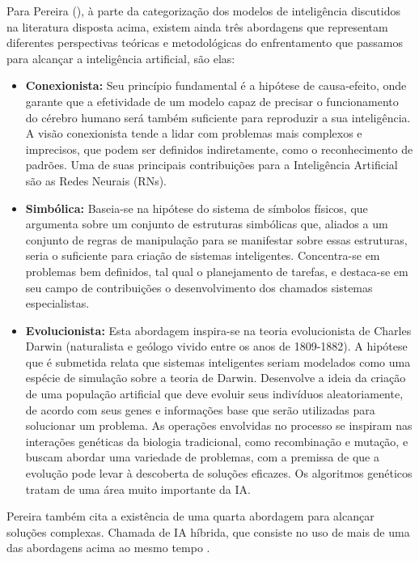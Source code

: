 \documentclass[tcc2]{uftex}
\begin{document}
Para Pereira (\citeyear{Pereira}), à parte da categorização dos modelos de inteligência discutidos na literatura disposta acima, existem ainda três abordagens que representam diferentes perspectivas teóricas e metodológicas do enfrentamento que passamos para alcançar a inteligência artificial, são elas:
\begin{itemize}
    \item \textbf{Conexionista:} Seu princípio fundamental é a hipótese de causa-efeito, onde garante que a efetividade de um modelo capaz de precisar o funcionamento do cérebro humano será também suficiente para reproduzir a sua inteligência. A visão conexionista tende a lidar com problemas mais complexos e imprecisos, que podem ser definidos indiretamente, como o reconhecimento de padrões. Uma de suas principais contribuições para a Inteligência Artificial são as Redes Neurais (RNs).
\end{itemize}
\begin{itemize}
    \item \textbf{Simbólica:} Baseia-se na hipótese do sistema de símbolos físicos, que argumenta sobre um conjunto de estruturas simbólicas que, aliados a um conjunto de regras de manipulação para se manifestar sobre essas estruturas, seria o suficiente para criação de sistemas inteligentes. Concentra-se em problemas bem definidos, tal qual o planejamento de tarefas, e destaca-se em seu campo de contribuições o desenvolvimento dos chamados sistemas especialistas.
\end{itemize}
\begin{itemize}
    \item \textbf{Evolucionista:} Esta abordagem inspira-se na teoria evolucionista de Charles Darwin (naturalista e geólogo vivido entre os anos de 1809-1882). A hipótese que é submetida relata que sistemas inteligentes seriam modelados como uma espécie de simulação sobre a teoria de Darwin. Desenvolve a ideia da criação de uma população artificial que deve evoluir seus indivíduos aleatoriamente, de acordo com seus genes e informações base que serão utilizadas para solucionar um problema. As operações envolvidas no processo se inspiram nas interações genéticas da biologia tradicional, como recombinação e mutação, e buscam abordar uma variedade de problemas, com a premissa de que a evolução pode levar à descoberta de soluções eficazes. Os algoritmos genéticos tratam de uma área muito importante da IA.
\end{itemize}

Pereira também cita a existência de uma quarta abordagem para alcançar soluções complexas. Chamada de IA híbrida, que consiste no uso de mais de uma das abordagens acima ao mesmo tempo \cite{Pereira}.
\end{document}
